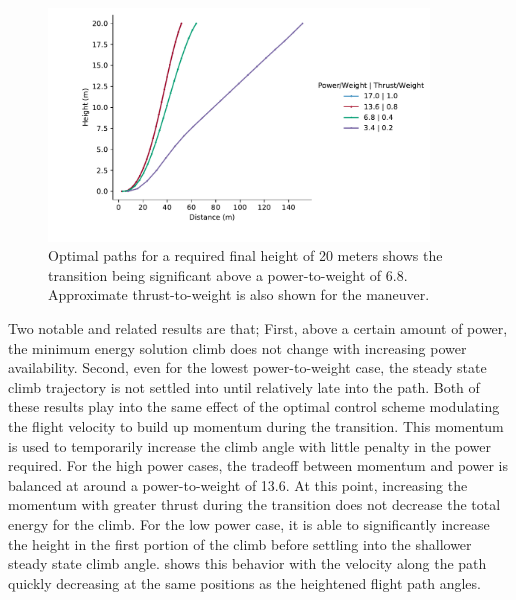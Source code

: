 \documentclass[10pt,english]{article}
\begin{document}
\begin{figure}[H]
\centering
\includegraphics[trim={.0cm 0.5cm .0cm 0cm},clip,width=0.9\textwidth]{pn_pd}
\vspace{-5pt}
\caption{Optimal paths for a required final height of 20 meters shows the transition being significant above a power-to-weight of 6.8. Approximate thrust-to-weight is also shown for the maneuver.}
\label{f:dyanmic_path}
\end{figure}

Two notable and related results are that; First, above a certain amount of power, the minimum energy solution climb does not change with increasing power availability. Second, even for the lowest power-to-weight case, the steady state climb trajectory is not settled into until relatively late into the path.  Both of these results play into the same effect of the optimal control scheme modulating the flight velocity to build up momentum during the transition.  This momentum is used to temporarily increase the climb angle with little penalty in the power required.  For the high power cases, the tradeoff between momentum and power is balanced at around a power-to-weight of 13.6.  At this point, increasing the momentum with greater thrust during the transition does not decrease the total energy for the climb.  For the low power case, it is able to significantly increase the height in the first portion of the climb before settling into the shallower steady state climb angle.   shows this behavior with the velocity along the path quickly decreasing at the same positions as the heightened flight path angles.
\end{document}

